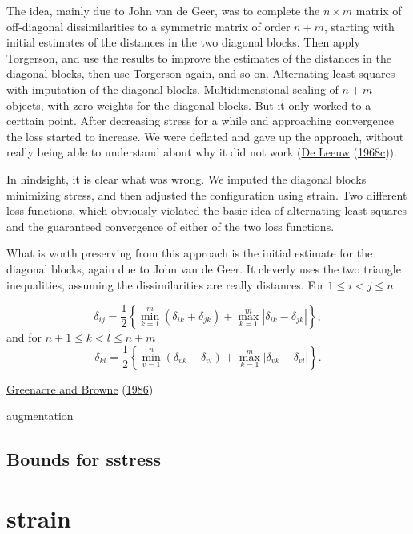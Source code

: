 \documentclass[
  12pt,
]{book}
\theoremstyle{definition}
\theoremstyle{definition}
\theoremstyle{definition}
\theoremstyle{definition}
\theoremstyle{remark}
\begin{document}
The idea, mainly due to John van de Geer, was to complete the \(n\times m\) matrix of
off-diagonal dissimilarities to a symmetric matrix of order \(n+m\), starting with initial estimates of the distances in the two diagonal blocks. Then apply Torgerson, and use the results to improve the estimates of the distances in the diagonal blocks, then use
Torgerson again, and so on. Alternating least squares with imputation of the diagonal blocks. Multidimensional scaling of \(n+m\) objects, with zero weights for the diagonal blocks. But it only worked to a certtain point. After decreasing stress for a while and
approaching convergence the loss started to increase. We were deflated and gave up the approach, without really being able to understand about why it did not work (\protect\hyperlink{ref-deleeuw_R_68g}{De Leeuw} (\protect\hyperlink{ref-deleeuw_R_68g}{1968c})).

In hindsight, it is clear what was wrong. We imputed the diagonal blocks minimizing
stress, and then adjusted the configuration using strain. Two different loss functions,
which obviously violated the basic idea of alternating least squares and the guaranteed convergence of either of the two loss functions.

What is worth preserving from this approach is the initial estimate for the diagonal blocks, again due to John van de Geer. It cleverly uses the two triangle inequalities, assuming the dissimilarities are really distances. For \(1\leq i<j\leq n\)

\[
\delta_{ij}=\frac12\left\{\min_{k=1}^m(\delta_{ik}+\delta_{jk}) + \max_{k=1}^m|\delta_{ik}-\delta_{jk}|\right\},
\]
and for \(n+1\leq k<l\leq n+m\)
\[
\delta_{kl}=\frac12\left\{\min_{v=1}^n(\delta_{vk}+\delta_{vl}) + \max_{k=1}^m|\delta_{vk}-\delta_{vl}|\right\}.
\]

\protect\hyperlink{ref-greenacre_browne_86}{Greenacre and Browne} (\protect\hyperlink{ref-greenacre_browne_86}{1986})

augmentation

\hypertarget{bounds-for-sstress}{%
\subsection{Bounds for sstress}\label{bounds-for-sstress}}

\hypertarget{strain}{%
\section{strain}\label{strain}}
\end{document}
